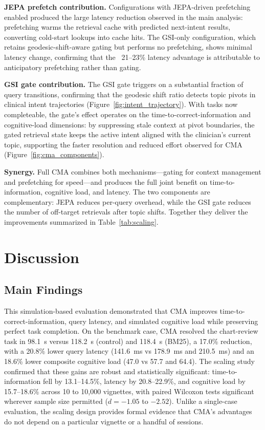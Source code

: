 \documentclass[preprint,12pt]{elsarticle}
\begin{document}
\textbf{JEPA prefetch contribution.} Configurations with JEPA-driven prefetching enabled produced the large latency reduction observed in the main analysis: prefetching warms the retrieval cache with predicted next-intent results, converting cold-start lookups into cache hits. The GSI-only configuration, which retains geodesic-shift-aware gating but performs no prefetching, shows minimal latency change, confirming that the ~21--23\% latency advantage is attributable to anticipatory prefetching rather than gating.

\textbf{GSI gate contribution.} The GSI gate triggers on a substantial fraction of query transitions, confirming that the geodesic shift ratio detects topic pivots in clinical intent trajectories (Figure~\ref{fig:intent_trajectory}). With tasks now completeable, the gate's effect operates on the time-to-correct-information and cognitive-load dimensions: by suppressing stale context at pivot boundaries, the gated retrieval state keeps the active intent aligned with the clinician's current topic, supporting the faster resolution and reduced effort observed for CMA (Figure~\ref{fig:cma_components}).

\textbf{Synergy.} Full CMA combines both mechanisms---gating for context management and prefetching for speed---and produces the full joint benefit on time-to-information, cognitive load, and latency. The two components are complementary: JEPA reduces per-query overhead, while the GSI gate reduces the number of off-target retrievals after topic shifts. Together they deliver the improvements summarized in Table~\ref{tab:scaling}.

\section{Discussion}

\subsection{Main Findings}
This simulation-based evaluation demonstrated that CMA improves time-to-correct-information, query latency, and simulated cognitive load while preserving perfect task completion. On the benchmark case, CMA resolved the chart-review task in 98.1~s versus 118.2~s (control) and 118.4~s (BM25), a 17.0\% reduction, with a 20.8\% lower query latency (141.6~ms vs 178.9~ms and 210.5~ms) and an 18.6\% lower composite cognitive load (47.0 vs 57.7 and 64.4). The scaling study confirmed that these gains are robust and statistically significant: time-to-information fell by 13.1--14.5\%, latency by 20.8--22.9\%, and cognitive load by 15.7--18.6\% across 10 to 10{,}000 vignettes, with paired Wilcoxon tests significant wherever sample size permitted ($d = -1.05$ to $-2.52$). Unlike a single-case evaluation, the scaling design provides formal evidence that CMA's advantages do not depend on a particular vignette or a handful of sessions.
\end{document}
